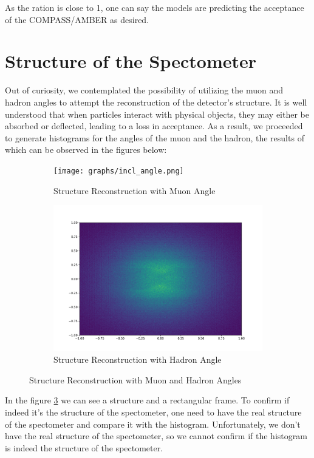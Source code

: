 \documentclass{article}
\begin{document}
As the ration is close to 1, one can say the models are predicting the acceptance of the COMPASS/AMBER as desired.

\section{Structure of the Spectometer}
Out of curiosity, we contemplated the possibility of utilizing the muon and hadron angles to attempt the reconstruction of the detector's structure. It is well understood that when particles interact with physical objects, they may either be absorbed or deflected, leading to a loss in acceptance. As a result, we proceeded to generate histograms for the angles of the muon and the hadron, the results of which can be observed in the figures below:

\begin{figure}[H]
    \centering
    \begin{subfigure}[b]{0.45\textwidth}
        \texttt{[image: graphs/incl\_angle.png]}
        \caption{Structure Reconstruction with Muon Angle}
        \label{fig:muon_angle}
    \end{subfigure}
    \hfill
    \begin{subfigure}[b]{0.45\textwidth}
        \includegraphics[width=\textwidth]{graphs/hadron_angle.png}
        \caption{Structure Reconstruction with Hadron Angle}
        \label{fig:hadron_angle}
    \end{subfigure}
    \caption{Structure Reconstruction with Muon and Hadron Angles}
\end{figure}

In the figure \ref{fig:hadron_angle} we can see a structure and a rectangular frame. To confirm if indeed it's
the structure of the spectometer, one need to have the real structure of the spectometer and compare it with the histogram.
Unfortunately, we don't have the real structure of the spectometer, so we cannot confirm if the histogram is indeed the structure of the spectometer.
\end{document}
